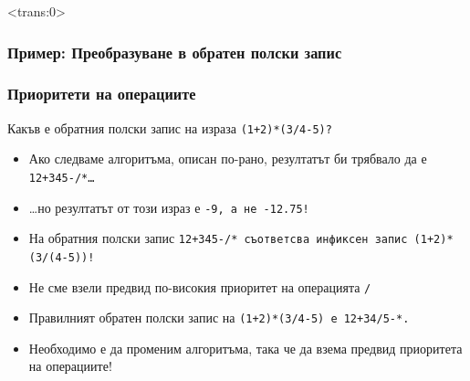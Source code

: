 \documentclass[alsotrans]{beamerswitch}
\begin{document}
\begin{frame}<trans:0>
  \frametitle{Пример: Преобразуване в обратен полски запис}

  \begin{center}
  \end{center}
\end{frame}

\begin{frame}
  \frametitle{Приоритети на операциите}
  Какъв е обратния полски запис на израза \tt{(1+2)*(3/4-5)}?
  \begin{itemize}[<+->]
  \item Ако следваме алгоритъма, описан по-рано, резултатът би трябвало да е \tt{12+345-/*}\ldots
  \item \ldots \alert{но резултатът от този израз е \tt{-9}, а не \tt{-12.75}!}
  \item На обратния полски запис \tt{12+345-/*} съответсва инфиксен запис \tt{(1+2)*(3/(4-5))}!
  \item \alert{Не сме взели предвид по-високия приоритет на операцията \tt/}
  \item Правилният обратен полски запис на \tt{(1+2)*(3/4-5)} е \tt{12+34/5-*}.
  \item \alert{Необходимо е да променим алгоритъма, така че да взема предвид приоритета на операциите!}
  \end{itemize}
\end{frame}
\end{document}
